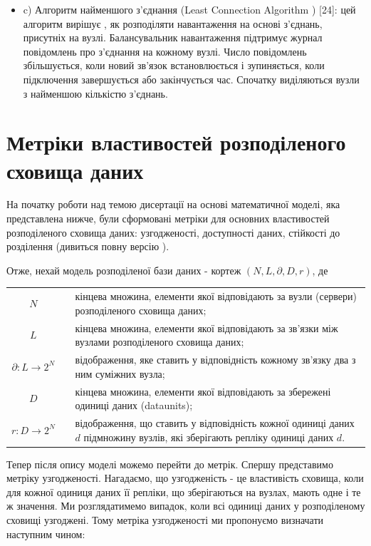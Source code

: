 \documentclass[14pt]{vakthesis}
\begin{document}
\begin{enumerate}
\begin{itemize}
\item c)  Алгоритм найменшого з'єднання (Least  Connection  Algorithm ) [24]: цей алгоритм вирішує , як розподіляти навантаження на основі з'єднань, 
присутніх на вузлі. Балансувальник навантаження підтримує журнал повідомлень про з'єднання на кожному вузлі. Число повідомлень збільшується, коли новий
зв'язок встановлюється і зупиняється, коли підключення завершується або закінчується час. Спочатку виділяються вузли з найменшою кількістю з'єднань.

\end{itemize}
\end{enumerate}

\chapter{Метріки властивостей розподіленого сховища даних}

На початку роботи над темою дисертації на основі математичної моделі, яка представлена нижче, були сформовані метріки для основних властивостей розподіленого сховища даних: 
узгодженості, доступності даних, стійкості до розділення (дивиться повну версію 
). 

Отже, нехай модель розподіленої бази даних - кортеж $(N, L, \partial,D, r)$, де \\

\begin{tabular*}{\textwidth}{cp{0.5cm}p{}}
$N$&& кінцева множина, елементи якої відповідають за вузли (сервери) розподіленого сховища даних; \\
$L$&& кінцева множина, елементи якої відповідають за зв'язки між вузлами розподіленого сховища даних; \\
$\partial:L\rightarrow 2^N$&& відображення, яке ставить у відповідність кожному зв'язку два з ним суміжних вузла;\\
$D$&& кінцева множина, елементи якої відповідають за збережені одиниці даних (dataunits);\\
$r:D\rightarrow 2^N$&& відображення, що ставить у відповідність кожної одиниці даних $d$ підмножину вузлів, які зберігають репліку одиниці даних $d$.
\end{tabular*}


Тепер після опису моделі можемо перейти до метрік. Спершу представимо метріку узгодженості.
Нагадаємо, що узгодженість - це властивість сховища, коли для кожної одиниця даних її репліки, що зберігаються на вузлах, 
мають одне і те ж значення. Ми розглядатимемо випадок, коли всі одиниці даних у розподіленому сховищі узгоджені. Тому метріка узгодженості ми пропонуємо визначати наступним чином:
\end{document}
